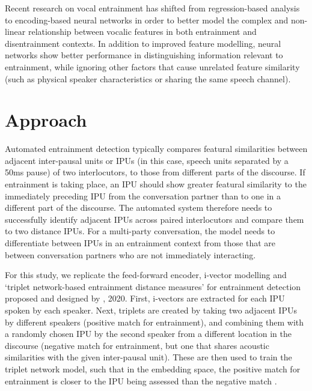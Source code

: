     Recent research on vocal entrainment has shifted from regression-based analysis to encoding-based neural networks in order to better model the complex and non-linear relationship between vocalic features in both entrainment and disentrainment contexts. In addition to improved feature modelling, neural networks show better performance in distinguishing information relevant to entrainment, while ignoring other factors that cause unrelated feature similarity (such as physical speaker characteristics or sharing the same speech channel)\parencite{nasir2020}.

\section{Approach}

    Automated entrainment detection typically compares featural similarities between adjacent inter-pausal units or IPUs (in this case, speech units separated by a 50ms pause) of two interlocutors, to those from different parts of the discourse. If entrainment is taking place, an IPU should show greater featural similarity to the immediately preceding IPU from the conversation partner than to one in a different part of the discourse. The automated system therefore needs to successfully identify adjacent IPUs across paired interlocutors and compare them to two distance IPUs. For a multi-party conversation, the model needs to differentiate between IPUs in an entrainment context from those that are between conversation partners who are not immediately interacting.

    For this study, we replicate the feed-forward encoder, i-vector modelling and `triplet network-based entrainment distance measures' for entrainment detection proposed and designed by \citeauthor{nasir2020}, 2020. First, i-vectors are extracted for each IPU spoken by each speaker. Next, triplets are created by taking two adjacent IPUs by different speakers (positive match for entrainment), and combining them with a randomly chosen IPU by the second speaker from a different location in the discourse (negative match for entrainment, but one that shares acoustic similarities with the given inter-pausal unit). These are then used to train the triplet network model, such that in the embedding space, the positive match for entrainment is closer to the IPU being assessed than the negative match \cite{hoffer2015deep}.


